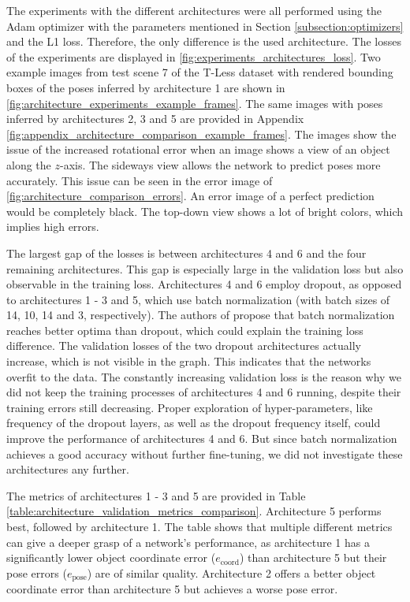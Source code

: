 The experiments with the different architectures were all performed using the Adam optimizer with the parameters mentioned in Section \ref{subsection:optimizers} and the L1 loss.
Therefore, the only difference is the used architecture. The losses of the experiments are displayed in \fig \ref{fig:experiments_architectures_loss}. Two example images from test scene 7 of the T-Less dataset with rendered bounding boxes of the poses inferred by architecture 1 are shown in \fig \ref{fig:architecture_experiments_example_frames}. The same images with poses inferred by architectures 2, 3 and 5 are provided in Appendix \ref{fig:appendix_architecture_comparison_example_frames}. The images show the issue of the increased rotational error when an image shows a view of an object along the $z$-axis. The sideways view allows the network to predict poses more accurately. This issue can be seen in the error image of \fig \ref{fig:architecture_comparison_errors}. An error image of a perfect prediction would be completely black. The top-down view shows a lot of bright colors, which implies high errors.

The largest gap of the losses is between architectures 4 and 6 and the four remaining architectures. This gap is especially large in the validation loss but also observable in the training loss. Architectures 4 and 6 employ dropout, as opposed to architectures 1 - 3 and 5, which use batch normalization (with batch sizes of 14, 10, 14 and 3, respectively). The authors of \cite{batch_normalization}  propose that batch normalization reaches better optima than dropout, which could explain the training loss difference. The validation losses of the two dropout architectures actually increase, which is not visible in the graph. This indicates that the networks overfit to the data. The constantly increasing validation loss is the reason why we did not keep the training processes of architectures 4 and 6 running, despite their training errors still decreasing. Proper exploration of hyper-parameters, like frequency of the dropout layers, as well as the dropout frequency itself, could improve the performance of architectures 4 and 6. But since batch normalization achieves a good accuracy without further fine-tuning, we did not investigate these architectures any further.

The metrics of architectures 1 - 3 and 5 are provided in Table \ref{table:architecture_validation_metrics_comparison}. Architecture 5 performs best, followed by architecture 1. The table shows that multiple different metrics can give a deeper grasp of a network's performance, as architecture 1 has a significantly lower object coordinate error ($e_{\text{coord}}$) than architecture 5 but their pose errors ($e_{\text{pose}}$) are of similar quality. Architecture 2 offers a better object coordinate error than architecture 5 but achieves a worse pose error.

